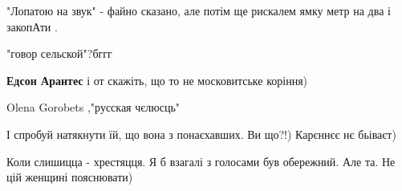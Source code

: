  
"Лопатою на звук" - файно сказано, але потім ще рискалем ямку метр на два і закопАти .

 
"говор сельской"?бггг

\begin{itemize}
 
\textbf{Едсон Арантес} і от скажіть, що то не московитське коріння)

 
Olena Gorobets ,"русская чєлюсць"

 
І спробуй натякнути їй, що вона з понаєхавших. Ви що?!) Карєннєє нє бьіваєт)

\end{itemize}

 
Коли слишицца - хрестяцця. Я б взагалі з голосами був обережний. Але та. Не цій
женщині пояснювати)

